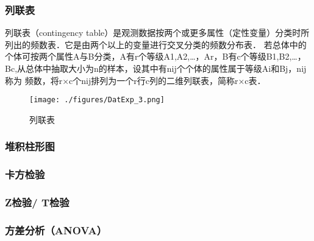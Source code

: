 \subsubsection{列联表}
列联表（contingency table）是观测数据按两个或更多属性（定性变量）分类时所列出的频数表．它是由两个以上的变量进行交叉分类的频数分布表．
若总体中的个体可按两个属性A与B分类，A有r个等级A1,A2,…，Ar，B有c个等级B1,B2,…，Bc,从总体中抽取大小为n的样本，设其中有nij个个体的属性属于等级Ai和Bj，nij称为 频数，将r×c个nij排列为一个r行c列的二维列联表，简称r×c表．
\begin{figure}[ht]
\centering
\texttt{[image: ./figures/DatExp\_3.png]}
\caption{列联表} \label{DatExp_fig3}
\end{figure}
\subsubsection{堆积柱形图}
\subsubsection{卡方检验}
\subsubsection{Z检验/ T检验}
\subsubsection{方差分析（ANOVA）}
